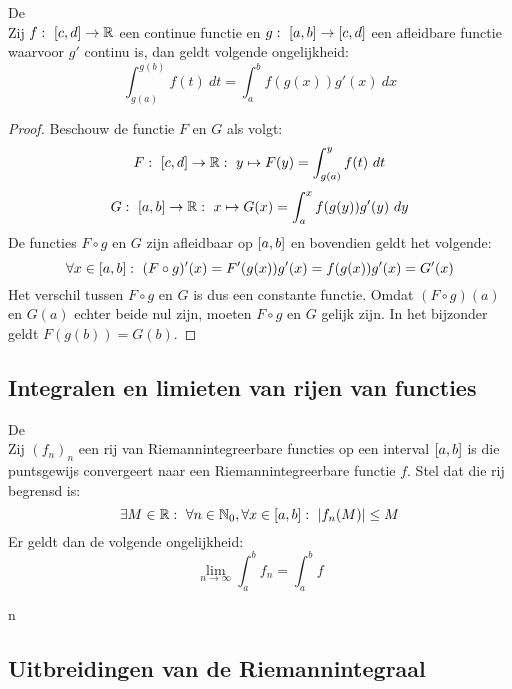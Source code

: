 \documentclass[main.tex]{subfiles}
\begin{document}
\begin{bpr}
  De \\
  Zij $f:\ \interval{c}{d}\rightarrow\mathbb{R}$ een continue functie en $g:\ \interval{a}{b} \rightarrow \interval{c}{d}$ een afleidbare functie waarvoor $g'$ continu is, dan geldt volgende ongelijkheid:
  \[ \int_{g(a)}^{g(b)}f(t)\ dt = \int_{a}^{b}f(g(x))g'(x)\ dx \]

  \begin{proof}
    Beschouw de functie $F$ en $G$ als volgt:
    \[ F:\ \interval{c}{d} \rightarrow \mathbb{R}:\ y \mapsto F(y) = \int_{g(a)}^{y}f(t)\ dt \]
    \[ G:\ \interval{a}{b} \rightarrow \mathbb{R}:\ x \mapsto G(x) = \int_{a}^{x}f(g(y))g'(y)\ dy \]
    De functies $F \circ g$ en $G$ zijn afleidbaar op $\interval{a}{b}$ en bovendien geldt het volgende:
    \[ \forall x\in\interval{a}{b}:\ (F \circ g)'(x) = F'(g(x))g'(x) = f(g(x))g'(x) = G'(x) \]
    Het verschil tussen $F\circ g$ en $G$ is dus een constante functie.
    Omdat $(F \circ g)(a)$ en $G(a)$ echter beide nul zijn, moeten $F\circ g$ en $G$ gelijk zijn.
    In het bijzonder geldt $F(g(b)) = G(b)$.
  \end{proof}
\end{bpr}

\subsection{Integralen en limieten van rijen van functies}
\label{sec:integr-en-limi}

\begin{bst}
  De \\
  Zij $(f_{n})_{n}$ een rij van Riemannintegreerbare functies op een interval $\interval{a}{b}$ is die puntsgewijs convergeert naar een Riemannintegreerbare functie $f$.
  Stel dat die rij begrensd is:
  \[ \exists M\in \mathbb{R}:\ \forall n\in \mathbb{N}_{0}, \forall x \in \interval{a}{b}:\ \left|f_{n}(M)\right| \le M \]
  Er geldt dan de volgende ongelijkheid:
  \[ \lim_{n\rightarrow \infty}\int_{a}^{b}f_{n} = \int_{a}^{b}f \]
\zb
\end{bst}

n

\subsection{Uitbreidingen van de Riemannintegraal}
\label{sec:uitbreidingen-van-de}
\end{document}

